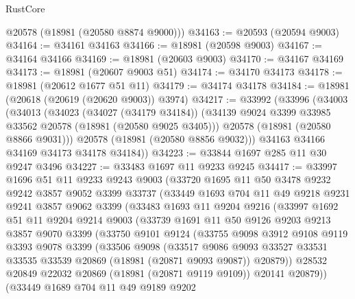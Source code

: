 \begin{lexlean}{RustCore}
\begin{coremodule}
      @20578
      (@18981 (@20580 @8874 @9000)))
@34163 := @20593 (@20594 @9003)
@34164 := @34161 @34163
@34166 := @18981 (@20598 @9003)
@34167 := @34164 @34166
@34169 := @18981 (@20603 @9003)
@34170 := @34167 @34169
@34173 := @18981 (@20607 @9003 @51)
@34174 := @34170 @34173
@34178 := @18981 (@20612 @1677 @51 @11)
@34179 := @34174 @34178
@34184 := @18981 (@20618 (@20619 (@20620 @9003)) @3974)
@34217 := @33992
    (@33996
      (@34003
        (@34013
          (@34023
            (@34027 (@34179 @34184))
            (@34139 @9024 @3399 @33985 @33562 @20578 (@18981 (@20580 @9025 @3405)))
            @20578
            (@18981 (@20580 @8866 @9031)))
          @20578
          (@18981 (@20580 @8856 @9032)))
        @34163
        @34166
        @34169
        @34173
        @34178
        @34184))
@34223 := @33844 @1697 @285 @11 @30 @9247 @3496
@34227 := @33483 @1697 @11 @9233 @9245
@34417 := @33997
    @1696
    @51
    @11
    @9233
    @9243
    @9003
    (@33720
      @1695
      @11
      @50
      @3478
      @9232
      @9242
      @3857
      @9052
      @3399
      @33737
      (@33449
        @1693
        @704
        @11
        @49
        @9218
        @9231
        @9241
        @3857
        @9062
        @3399
        (@33483
          @1693
          @11
          @9204
          @9216
          (@33997
            @1692
            @51
            @11
            @9204
            @9214
            @9003
            (@33739
              @1691
              @11
              @50
              @9126
              @9203
              @9213
              @3857
              @9070
              @3399
              (@33750
                @9101
                @9124
                (@33755
                  @9098
                  @3912
                  @9108
                  @9119
                  @3393
                  @9078
                  @3399
                  (@33506
                    @9098
                    (@33517
                      @9086
                      @9093
                      @33527
                      @33531
                      @33535
                      @33539
                      @20869
                      (@18981 (@20871 @9093 @9087))
                      @20879))
                  @28532
                  @20849
                  @22032
                  @20869
                  (@18981 (@20871 @9119 @9109))
                  @20141
                  @20879))
              (@33449
                @1689
                @704
                @11
                @49
                @9189
                @9202

\end{coremodule}
\end{lexlean}
